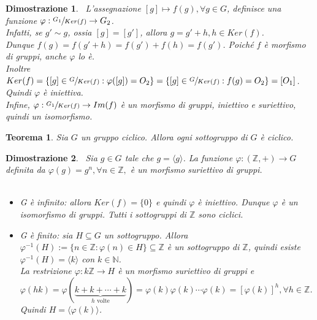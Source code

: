 \documentclass[a4paper,12pt]{article}
\theoremstyle{def}
\theoremstyle{prop}
\theoremstyle{esempio}
\theoremstyle{dimostrazione}
\newtheorem*{dimostrazione}{Dimostrazione}
\theoremstyle{teo}
\newtheorem*{teorema}{Teorema}
\theoremstyle{osservazione}
\begin{document}
\begin{dimostrazione}
    \
    L'assegnazione \([g] \mapsto f(g), \forall g \in  G\), definisce una funzione \(\varphi : \sfrac{G_1}{Ker(f)}
    \rightarrow G_2\).\\
    Infatti, se \(g' \sim g\), ossia \([g]  = [g']\), allora \(g = g' + h , h \in Ker(f)\).\\
    Dunque \(f(g) = f(g' + h) = f(g') + f(h) = f(g')\). Poiché \(f\) è morfismo di gruppi, anche \(\varphi\) lo è.\\
    Inoltre \(Ker(f) = \{[g] \in \sfrac{G}{Ker(f)} : \varphi([g]) = O_2\}=\{[g] \in  \sfrac{G}{Ker(f)} : f(g) = O_2\}
    = {[O_1]}\). Quindi \(\varphi\) è iniettiva.\\
    Infine, \( \varphi : \sfrac{G_1}{Ker(f)} \rightarrow Im(f)\) è un morfismo di gruppi, iniettivo e suriettivo, quindi un isomorfismo.
\end{dimostrazione}


\begin{teorema}
    Sia \(G\) un gruppo ciclico. Allora ogni sottogruppo di \(G\) è ciclico.
\end{teorema}

\begin{dimostrazione}
    \
    Sia \(g \in G\) tale che \(g = \langle g \rangle\). La funzione \(\varphi: (\mathbb{Z} , +) \rightarrow G\) definita
    da \(\varphi(g) = g^n, \forall  n \in \mathbb{Z}, \) è un morfismo suriettivo di gruppi.\\
    \
    \begin{itemize}
        \item G è infinito: allora \(Ker(f) = \{0\}\) e quindi \(\varphi\) è iniettivo. Dunque \(\varphi\) è un
              isomorfismo di gruppi. Tutti i sottogruppi di \(\mathbb{Z} \) sono ciclici.
        \item G è finito: sia \(H \subseteq G\) un sottogruppo. Allora \(\varphi^{-1}(H) := \{n \in \mathbb{Z} :
              \varphi(n) \in H\} \subseteq \mathbb{Z} \) è un sottogruppo di \(\mathbb{Z} \), quindi esiste \(
              \varphi^{-1}(H)= \langle k \rangle\) con \(k \in \mathbb{N} \).\\
              La restrizione \(\varphi: k \mathbb{Z} \rightarrow H\) è un morfismo suriettivo di gruppi e
              \(\varphi(hk) = \varphi(\underbrace{k+k+\cdots+k}_{h \text{ volte}}) = \varphi(k) \varphi(k) \cdots
              \varphi(k) = [\varphi(k)]^h , \forall h \in \mathbb{Z} \). Quindi \(H = \langle \varphi(k) \rangle\).
    \end{itemize}
\end{dimostrazione}
\end{document}
